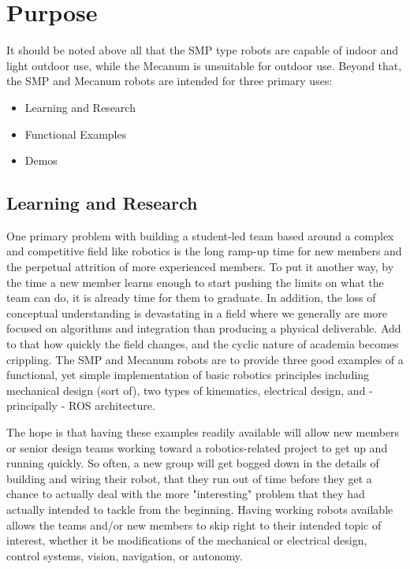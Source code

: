 
\chapter{Purpose}
\label{chap:purpose}

It should be noted above all that the SMP type robots are capable of indoor and light outdoor use, while the Mecanum is unsuitable for outdoor use. Beyond that, the SMP and Mecanum robots are intended for three primary uses:

\begin{itemize}
\item{Learning and Research}
\item{Functional Examples}
\item{Demos}
\end{itemize}

\section{Learning and Research}

One primary problem with building a student-led team based around a complex and competitive field like robotics is the long ramp-up time for new members and the perpetual attrition of more experienced members. To put it another way, by the time a new member learns enough to start pushing the limits on what the team can do, it is already time for them to graduate. In addition, the loss of conceptual understanding is devastating in a field where we generally are more focused on algorithms and integration than producing a physical deliverable. Add to that how quickly the field changes, and the cyclic nature of academia becomes crippling. The SMP and Mecanum robots are to provide three good examples of a functional, yet simple implementation of basic robotics principles including mechanical design (sort of), two types of kinematics, electrical design, and - principally - ROS architecture.

The hope is that having these examples readily available will allow new members or senior design teams working toward a robotics-related project to get up and running quickly. So often, a new group will get bogged down in the details of building and wiring their robot, that they run out of time before they get a chance to actually deal with the more "interesting" problem that they had actually intended to tackle from the beginning. Having working robots available allows the teams and/or new members to skip right to their intended topic of interest, whether it be modifications of the mechanical or electrical design, control systems, vision, navigation, or autonomy.

